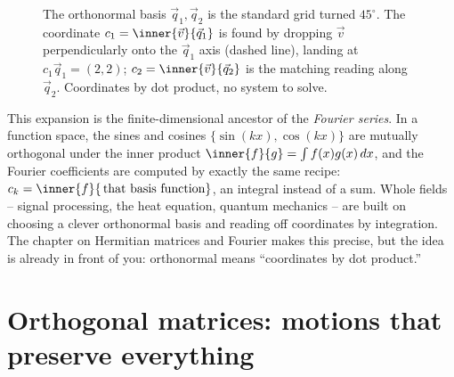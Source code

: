 \begin{figure}[H]
\centering
{}
\caption{The orthonormal basis $\vec q_1,\vec q_2$ is the standard grid turned $45^\circ$. The
coordinate $c_1=\inner{\vec v}{\vec q_1}$ is found by dropping $\vec v$ perpendicularly onto the
$\vec q_1$ axis (dashed line), landing at $c_1\vec q_1=(2,2)$; $c_2=\inner{\vec v}{\vec q_2}$ is the
matching reading along $\vec q_2$. Coordinates by dot product, no system to solve.}
\label{ch17:tilted-grid}
\end{figure}

\begin{connectionbox}
This expansion is the finite-dimensional ancestor of the \emph{Fourier series}. In a function
space, the sines and cosines $\{\sin(kx),\cos(kx)\}$ are mutually orthogonal under the inner
product $\inner{f}{g}=\int f(x)g(x)\,dx$, and the Fourier coefficients are computed by exactly the
same recipe: $c_k = \inner{f}{\,\text{that basis function}}$, an integral instead of a sum. Whole
fields -- signal processing, the heat equation, quantum mechanics -- are built on choosing a clever
orthonormal basis and reading off coordinates by integration. The chapter on Hermitian matrices and
Fourier makes this precise, but the idea is already in front of you: orthonormal means
``coordinates by dot product.''
\end{connectionbox}

\section{Orthogonal matrices: motions that preserve everything}

